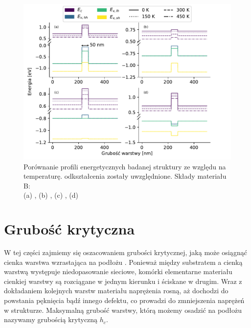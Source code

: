 \documentclass[12pt,openany,a4paper]{book}
\begin{document}
\begin{figure}[H]
	\centering
	\includegraphics[width = 1\linewidth]{Figures/structure/temp_strain.pdf}
	\caption{Porównanie profili energetycznych badanej struktury ze względu na
	temperaturę. odkształcenia zostały uwzględnione.
	Składy materiału B: \\(a) ,
	(b) , (c) ,
	(d) }\label{fig:strain_temp}
\end{figure}

\section{Grubość krytyczna}

W tej części zajmiemy się oszacowaniem grubości krytycznej, jaką może osiągnąć cienka
warstwa  wzrastająca na podłożu .
Ponieważ między substratem a cienką warstwą występuje niedopasowanie sieciowe, komórki
elementarne materiału cienkiej warstwy są rozciągane w jednym kierunku i ściskane w drugim.
Wraz z dokładaniem kolejnych warstw materiału naprężenia rosną, aż dochodzi do powstania
pęknięcia bądź innego defektu, co prowadzi do zmniejszenia naprężeń w strukturze.
Maksymalną grubość warstwy, którą możemy osadzić na podłożu nazywamy grubością krytyczną
\(h_c\).
\end{document}
